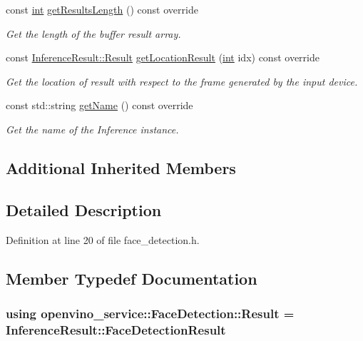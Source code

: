 \begin{DoxyCompactItemize}
const \hyperlink{CMakeCache_8txt_a79a3d8790b2588b09777910863574e09}{int} \hyperlink{classopenvino__service_1_1FaceDetection_a778bb42884d67b286e4e9656fb0a69ef}{get\+Results\+Length} () const override
\begin{DoxyCompactList}\small\item\em Get the length of the buffer result array. \end{DoxyCompactList}\item 
const \hyperlink{structInferenceResult_1_1Result}{Inference\+Result\+::\+Result} \hyperlink{classopenvino__service_1_1FaceDetection_ab4dd44a79728c5d3961023a73d2ceb0c}{get\+Location\+Result} (\hyperlink{CMakeCache_8txt_a79a3d8790b2588b09777910863574e09}{int} idx) const override
\begin{DoxyCompactList}\small\item\em Get the location of result with respect to the frame generated by the input device. \end{DoxyCompactList}\item 
const std\+::string \hyperlink{classopenvino__service_1_1FaceDetection_ac815cdf8a4ca763f204d17beb5385f5f}{get\+Name} () const override
\begin{DoxyCompactList}\small\item\em Get the name of the Inference instance. \end{DoxyCompactList}\end{DoxyCompactItemize}
\subsection*{Additional Inherited Members}


\subsection{Detailed Description}


Definition at line 20 of file face\+\_\+detection.\+h.



\subsection{Member Typedef Documentation}
\subsubsection[{\texorpdfstring{Result}{Result}}]{\setlength{\rightskip}{0pt plus 5cm}using {\bf openvino\+\_\+service\+::\+Face\+Detection\+::\+Result} =  {\bf Inference\+Result\+::\+Face\+Detection\+Result}}\hypertarget{classopenvino__service_1_1FaceDetection_a35ec2b5ed353d7f08a5475df7cccb249}{}\label{classopenvino__service_1_1FaceDetection_a35ec2b5ed353d7f08a5475df7cccb249}


